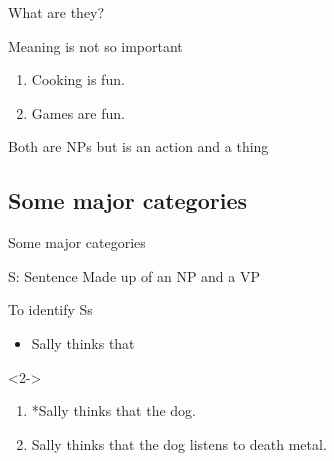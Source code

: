 \documentclass{beamer}
\newcommand{\suboneone}{What are they?}
\newcommand{\subonetwo}{Some major categories}
\begin{document}
      \begin{frame}{\suboneone}
        \begin{block}{}
          Meaning is not so important
        \end{block}
        \begin{example}
          \begin{enumerate}
            \item Cooking is fun.
            \item Games are fun.
          \end{enumerate}
        \end{example}
        \begin{block}{}
          Both are NPs but  is an action and  a thing
        \end{block}
      \end{frame}

    \subsection{\subonetwo}
      \begin{frame}{\subonetwo}
        \begin{block}{S: Sentence}
          Made up of an NP and a VP
        \end{block}
        \begin{block}{To identify Ss}
          \begin{itemize}
            \item Sally thinks that \hrulefill
          \end{itemize}
        \end{block}
        \begin{example}<2->
          \begin{enumerate}
            \item *Sally thinks that the dog.
            \item Sally thinks that the dog listens to death metal.
          \end{enumerate}
        \end{example}
      \end{frame}
\end{document}
